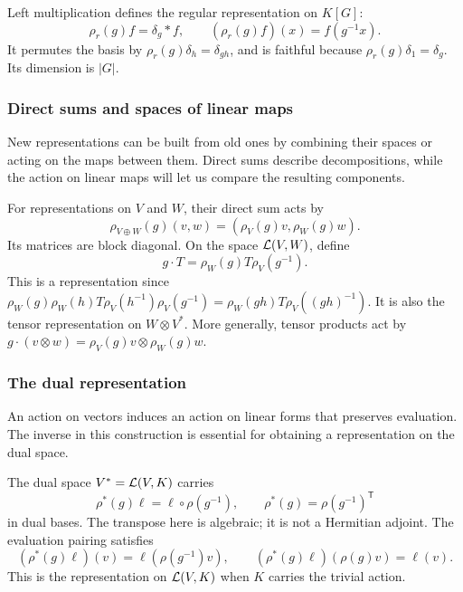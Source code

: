 Left multiplication defines the regular representation on $K[G]$:
\[
 \rho_r(g)f=\delta_g*f,\qquad (\rho_r(g)f)(x)=f(g^{-1}x).
\]
It permutes the basis by $\rho_r(g)\delta_h=\delta_{gh}$, and is faithful
because $\rho_r(g)\delta_1=\delta_g$. Its dimension is $|G|$.

\subsubsection{Direct sums and spaces of linear maps}
\label{sect3-representation-sum}\label{notation-73}\label{notation-74}

New representations can be built from old ones by combining their spaces or
acting on the maps between them. Direct sums describe decompositions, while
the action on linear maps will let us compare the resulting components.

For representations on $V$ and $W$, their direct sum acts by
\[
 \rho_{V\oplus W}(g)(v,w)=(\rho_V(g)v,\rho_W(g)w).
\]
Its matrices are block diagonal. On the space $\mathcal{L}(V,W)$, define
\label{sect3-representation-morphisms}\label{notation-75}\label{notation-76}
\begin{equation*}
 g\cdot T=\rho_W(g)T\rho_V(g^{-1}).
\end{equation*}
This is a representation since
$\rho_W(g)\rho_W(h)T\rho_V(h^{-1})\rho_V(g^{-1})
=\rho_W(gh)T\rho_V((gh)^{-1})$. It is also the tensor representation
on $W\otimes V^*$. More generally, tensor products act by
$g\cdot(v\otimes w)=\rho_V(g)v\otimes\rho_W(g)w$.

\subsubsection{The dual representation}
\label{sect3-dual-representation}
\label{notation-77}\label{notation-78}\label{notation-79}

An action on vectors induces an action on linear forms that preserves
evaluation. The inverse in this construction is essential for obtaining a
representation on the dual space.

The dual space $V^*=\mathcal{L}(V,K)$ carries
\[
 \rho^*(g)\ell=\ell\circ\rho(g^{-1}),\qquad
 \rho^*(g)=\rho(g^{-1})^{\mathsf T}
\]
in dual bases. The transpose here is algebraic; it is not a Hermitian
adjoint. The evaluation pairing satisfies
\[
 (\rho^*(g)\ell)(v)=\ell(\rho(g^{-1})v),\qquad
 (\rho^*(g)\ell)(\rho(g)v)=\ell(v).
\]
This is the representation on $\mathcal{L}(V,K)$ when $K$ carries the trivial action.

